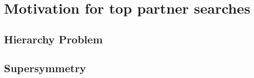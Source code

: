 \chapter{Motivation for top partner searches}




\section{Hierarchy Problem}%

\section{Supersymmetry}